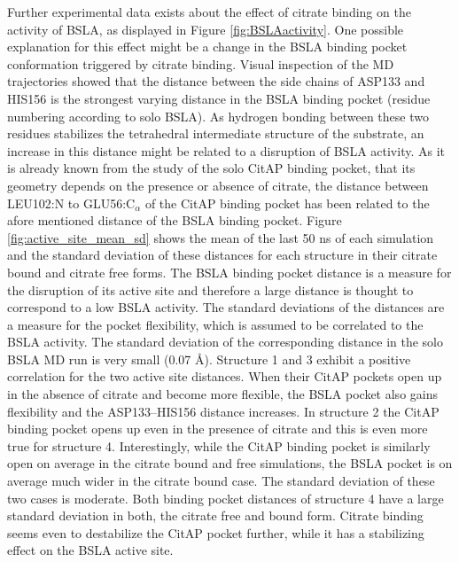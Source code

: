 \documentclass[english, a4paper, 12pt, titlepage, draft]{article}
\begin{document}
Further experimental data exists about the effect of citrate binding on the activity of BSLA, as displayed in Figure \ref{fig:BSLAactivity}.
One possible explanation for this effect might be a change in the BSLA binding pocket conformation triggered by citrate binding.
Visual inspection of the MD trajectories showed that the distance between the side chains of ASP133 and HIS156 is the strongest varying distance in the BSLA binding pocket (residue numbering according to solo BSLA).
As hydrogen bonding between these two residues stabilizes the tetrahedral intermediate structure of the substrate, an increase in this distance might be related to a disruption of BSLA activity.
As it is already known from the study of the solo CitAP binding pocket, that its geometry depends on the presence or absence of citrate, the distance between LEU102:N to GLU56:C$_{\alpha}$ of the CitAP binding pocket has been related to the afore mentioned distance of the BSLA binding pocket.
Figure \ref{fig:active_site_mean_sd} shows the mean of the last 50 ns of each simulation and the standard deviation of these distances for each structure in their citrate bound and citrate free forms.
The BSLA binding pocket distance is a measure for the disruption of its active site and therefore a large distance is thought to correspond to a low BSLA activity.
The standard deviations of the distances are a measure for the pocket flexibility, which is assumed to be correlated to the BSLA activity.
The standard deviation of the corresponding distance in the solo BSLA MD run is very small (0.07 \r{A}).
Structure 1 and 3 exhibit a positive correlation for the two active site distances.
When their CitAP pockets open up in the absence of citrate and become more flexible, the BSLA pocket also gains flexibility and the ASP133--HIS156 distance increases.
In structure 2 the CitAP binding pocket opens up even in the presence of citrate and this is even more true for structure 4.
Interestingly, while the CitAP binding pocket is similarly open on average in the citrate bound and free simulations, the BSLA pocket is on average much wider in the citrate bound case.
The standard deviation of these two cases is moderate.
Both binding pocket distances of structure 4 have a large standard deviation in both, the citrate free and bound form.
Citrate binding seems even to destabilize the CitAP pocket further, while it has a stabilizing effect on the BSLA active site.
\end{document}
